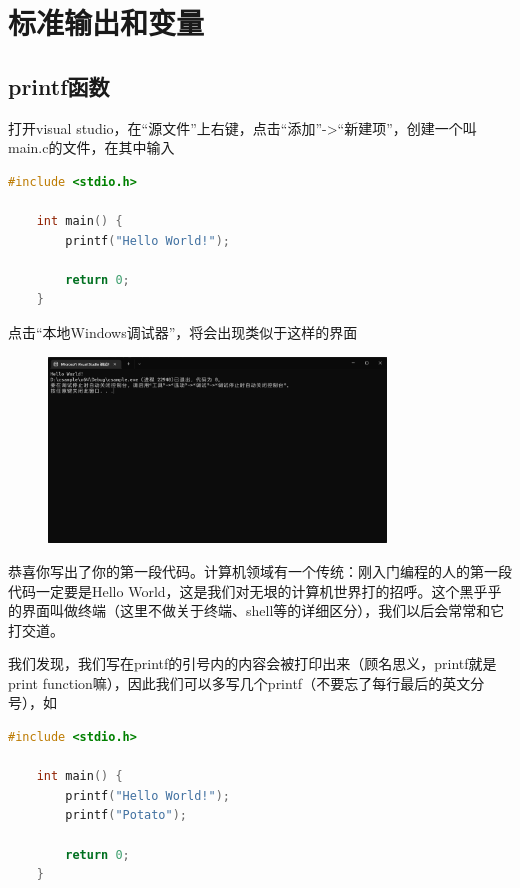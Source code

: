 \section{标准输出和变量}

\subsection{printf函数}

打开visual studio，在“源文件”上右键，点击“添加”->“新建项”，创建一个叫main.c的文件，在其中输入

\begin{lstlisting}[language=C]
    #include <stdio.h>
    
    int main() {
        printf("Hello World!");

        return 0;
    }
\end{lstlisting}

点击“本地Windows调试器”，将会出现类似于这样的界面

\begin{figure}[H]
    \centering
    \includegraphics[width=0.8\textwidth, height=0.4\textheight]{images/1HelloWorld结果.png}
\end{figure}

恭喜你写出了你的第一段代码。计算机领域有一个传统：刚入门编程的人的第一段代码一定要是Hello World，这是我们对无垠的计算机世界打的招呼。这个黑乎乎的界面叫做终端（这里不做关于终端、shell等的详细区分），我们以后会常常和它打交道。

我们发现，我们写在printf的引号内的内容会被打印出来（顾名思义，printf就是print function嘛），因此我们可以多写几个printf（不要忘了每行最后的英文分号），如

\begin{lstlisting}[language=C]
    #include <stdio.h>
    
    int main() {
        printf("Hello World!");
        printf("Potato");

        return 0;
    }
\end{lstlisting}

